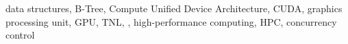 data structures, B-Tree, Compute Unified Device Architecture, CUDA, graphics processing unit, GPU, TNL, \CC, high-performance computing, HPC, concurrency control